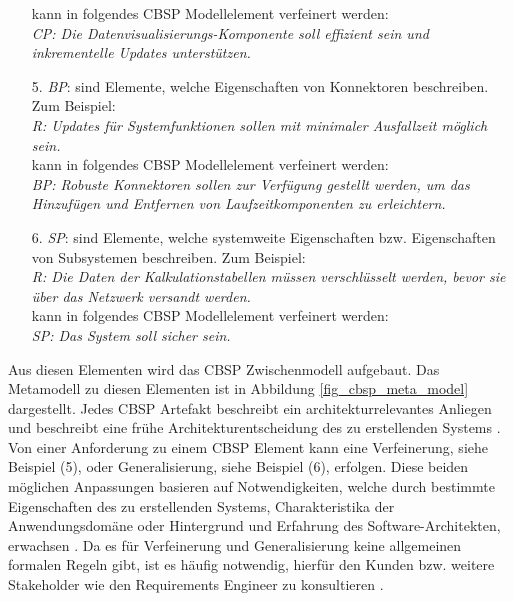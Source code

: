 \begin{itemize}
	kann in folgendes CBSP Modellelement verfeinert werden: \\
	\textit{CP: Die Datenvisualisierungs-Komponente soll effizient sein und inkrementelle Updates unterst\"utzen.} \cite{Gru01}
\item[5.] \textit{BP}: sind Elemente, welche Eigenschaften von Konnektoren beschreiben. Zum Beispiel: \\
	\textit{R: Updates f\"ur Systemfunktionen sollen mit minimaler Ausfallzeit m\"oglich sein.} \\
	kann in folgendes CBSP Modellelement verfeinert werden: \\
	\textit{BP: Robuste Konnektoren sollen zur Verf\"ugung gestellt werden, um das Hinzuf\"ugen und Entfernen von Laufzeitkomponenten zu erleichtern.} \cite{Gru01}
\item[6.] \textit{SP}: sind Elemente, welche systemweite Eigenschaften bzw. Eigenschaften von Subsystemen beschreiben. Zum Beispiel: \\
	\textit{R: Die Daten der Kalkulationstabellen m\"ussen verschl\"usselt werden, bevor sie \"uber das Netzwerk versandt werden.} \\
	kann in folgendes CBSP Modellelement verfeinert werden: \\
	\textit{SP: Das System soll sicher sein.} \cite{Gru01} \\
\end{itemize}

Aus diesen Elementen wird das CBSP Zwischenmodell aufgebaut. Das Metamodell zu diesen Elementen ist in Abbildung \ref{fig_cbsp_meta_model} dargestellt. Jedes CBSP Artefakt beschreibt ein architekturrelevantes Anliegen und beschreibt eine fr\"uhe Architekturentscheidung des zu erstellenden Systems \cite{Gru01}. \\

Von einer Anforderung zu einem CBSP Element kann eine Verfeinerung, siehe Beispiel (5), oder Generalisierung, siehe Beispiel (6), erfolgen. Diese beiden m\"oglichen Anpassungen basieren auf Notwendigkeiten, welche durch bestimmte Eigenschaften des zu erstellenden Systems, Charakteristika der Anwendungsdom\"ane oder Hintergrund und Erfahrung des Software-Architekten, erwachsen \cite{Gru01}. Da es f\"ur Verfeinerung und Generalisierung keine allgemeinen formalen Regeln gibt, ist es h\"aufig notwendig, hierf\"ur den Kunden bzw. weitere Stakeholder wie den Requirements Engineer zu konsultieren \cite{Gru01}. 

